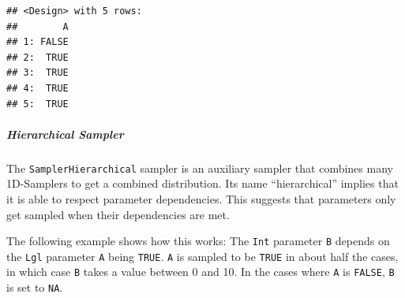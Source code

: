 \documentclass[]{article}
\newenvironment{Shaded}{\begin{snugshade}}{\end{snugshade}}
\newcommand{\DataTypeTok}[1]{\textcolor[rgb]{0.13,0.29,0.53}{#1}}
\newcommand{\DecValTok}[1]{\textcolor[rgb]{0.00,0.00,0.81}{#1}}
\newcommand{\KeywordTok}[1]{\textcolor[rgb]{0.13,0.29,0.53}{\textbf{#1}}}
\newcommand{\NormalTok}[1]{#1}
\newcommand{\OperatorTok}[1]{\textcolor[rgb]{0.81,0.36,0.00}{\textbf{#1}}}
\newcommand{\OtherTok}[1]{\textcolor[rgb]{0.56,0.35,0.01}{#1}}
\newcommand{\StringTok}[1]{\textcolor[rgb]{0.31,0.60,0.02}{#1}}
\let\oldsubparagraph\subparagraph
\renewcommand{\subparagraph}[1]{\oldsubparagraph{#1}\mbox{}}
\renewenvironment{Shaded} {\begin{snugshade}\small} {\end{snugshade}}
\begin{document}
\begin{Shaded}
\end{Shaded}

\begin{verbatim}
## <Design> with 5 rows:
##        A
## 1: FALSE
## 2:  TRUE
## 3:  TRUE
## 4:  TRUE
## 5:  TRUE
\end{verbatim}

\hypertarget{hierarchical-sampler}{%
\subparagraph{Hierarchical Sampler}\label{hierarchical-sampler}}

The \texttt{SamplerHierarchical} sampler is an auxiliary sampler that combines many 1D-Samplers to get a combined distribution.
Its name ``hierarchical'' implies that it is able to respect parameter dependencies.
This suggests that parameters only get sampled when their dependencies are met.

The following example shows how this works: The \texttt{Int} parameter \texttt{B} depends on the \texttt{Lgl} parameter \texttt{A} being \texttt{TRUE}.
\texttt{A} is sampled to be \texttt{TRUE} in about half the cases, in which case \texttt{B} takes a value between 0 and 10.
In the cases where \texttt{A} is \texttt{FALSE}, \texttt{B} is set to \texttt{NA}.

\begin{Shaded}
\end{Shaded}
\end{document}

